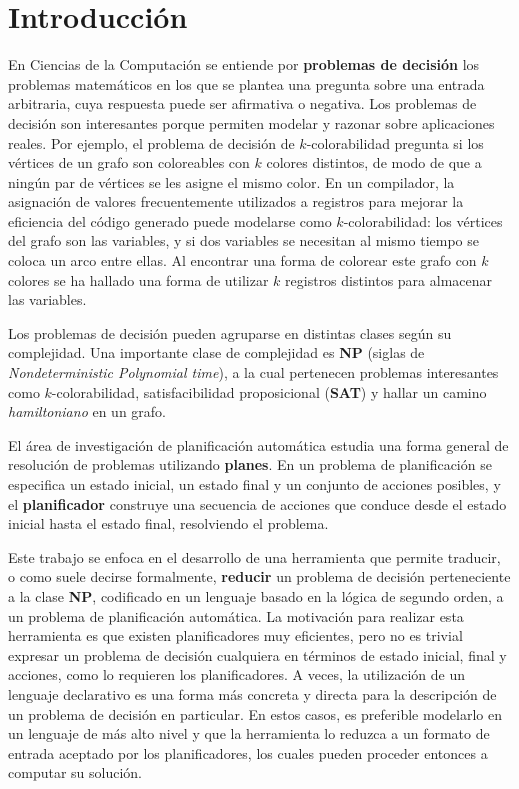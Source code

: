 
\chapter*{Introducción} %
\label{Intro}
En Ciencias de la Computación se entiende por \textbf{problemas de decisión}
los problemas matemáticos en los que se plantea una pregunta sobre una entrada
arbitraria, cuya respuesta puede ser afirmativa o negativa.
Los problemas de decisión son interesantes porque permiten modelar y razonar
sobre aplicaciones reales. Por ejemplo, el problema de decisión de
$k$-colorabilidad pregunta si los vértices de un grafo son coloreables 
con $k$ colores distintos, de modo de que a ningún par de vértices se les
asigne el mismo color. En un compilador, la asignación de valores
frecuentemente utilizados a registros para
mejorar la eficiencia del código generado puede modelarse como
$k$-colorabilidad: los vértices del grafo son las variables, y si dos variables
se necesitan al mismo tiempo se coloca un arco entre ellas. Al encontrar una
forma de colorear este grafo con $k$ colores se ha hallado una forma de
utilizar $k$ registros distintos para almacenar las variables.

Los problemas de decisión pueden agruparse en distintas clases según su
complejidad. Una importante clase de complejidad es \textbf{NP} (siglas de
\textit{Nondeterministic Polynomial time}), a la cual pertenecen problemas
interesantes como $k$-colorabilidad, satisfacibilidad proposicional
(\textbf{SAT}) y hallar un camino \textit{hamiltoniano} en un grafo.

El área de investigación de planificación automática estudia una forma general
de resolución de problemas utilizando \textbf{planes}. En un problema de planificación
se especifica un estado inicial, un estado final y un conjunto de acciones posibles,
y el \textbf{planificador} construye una secuencia de acciones que conduce
desde el estado inicial hasta el estado final, resolviendo el problema.


Este trabajo se enfoca en el desarrollo de una herramienta que permite
traducir, o como suele decirse formalmente, \textbf{reducir} un problema de
decisión perteneciente a la clase \textbf{NP}, codificado en un lenguaje
basado en la lógica de segundo orden, a un problema de
planificación automática. La motivación para realizar esta herramienta es que
existen planificadores muy eficientes, pero no es trivial
expresar un problema de decisión cualquiera en términos de estado inicial,
final y acciones, como lo requieren los
planificadores. A veces, la utilización de un lenguaje declarativo es una forma
más concreta y directa para la descripción de un problema de decisión en
particular. En estos casos, es preferible modelarlo en un lenguaje de más alto
nivel y que la herramienta lo reduzca a un formato de entrada aceptado por
los planificadores, los cuales pueden proceder entonces a computar su solución.

